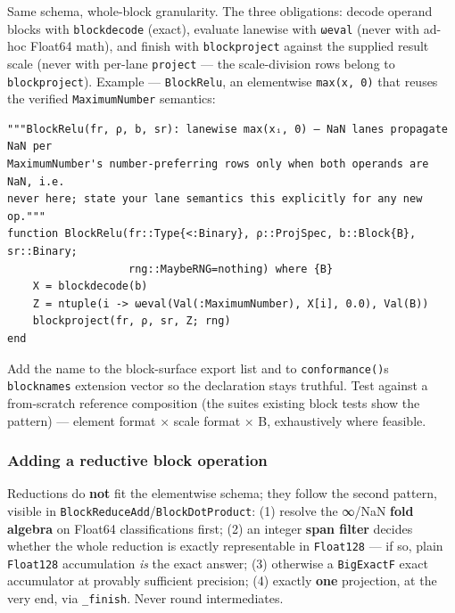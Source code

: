 \label{15527859041760837550}{}


Same schema, whole-block granularity. The three obligations: decode operand blocks with \texttt{blockdecode} (exact), evaluate lanewise with \texttt{ωeval} (never with ad-hoc Float64 math), and finish with \texttt{blockproject} against the supplied result scale (never with per-lane \texttt{project} — the scale-division rows belong to \texttt{blockproject}). Example — \texttt{BlockRelu}, an elementwise \texttt{max(x, 0)} that reuses the verified \texttt{MaximumNumber} semantics:




\nopagebreak[4]
\begin{verbatim}
"""BlockRelu(fr, ρ, b, sr): lanewise max(xᵢ, 0) — NaN lanes propagate NaN per
MaximumNumber's number-preferring rows only when both operands are NaN, i.e.
never here; state your lane semantics this explicitly for any new op."""
function BlockRelu(fr::Type{<:Binary}, ρ::ProjSpec, b::Block{B}, sr::Binary;
                   rng::MaybeRNG=nothing) where {B}
    X = blockdecode(b)
    Z = ntuple(i -> ωeval(Val(:MaximumNumber), X[i], 0.0), Val(B))
    blockproject(fr, ρ, sr, Z; rng)
end
\end{verbatim}



Add the name to the block-surface export list and to \texttt{conformance()}{\textquotesingle}s \texttt{blocknames} extension vector so the declaration stays truthful. Test against a from-scratch reference composition (the suite{\textquotesingle}s existing block tests show the pattern) — element format × scale format × B, exhaustively where feasible.



\subsubsection{Adding a reductive block operation}



\label{9686810033048460081}{}


Reductions do \textbf{not} fit the elementwise schema; they follow the second pattern, visible in \texttt{BlockReduceAdd}/\allowbreak\texttt{BlockDotProduct}: (1) resolve the ∞/NaN \textbf{fold algebra} on Float64 classifications first; (2) an integer \textbf{span filter} decides whether the whole reduction is exactly representable in \texttt{Float128} — if so, plain \texttt{Float128} accumulation \emph{is} the exact answer; (3) otherwise a \texttt{BigExactF} exact accumulator at provably sufficient precision; (4) exactly \textbf{one} projection, at the very end, via \texttt{\_\allowbreak{}finish}. Never round intermediates.



